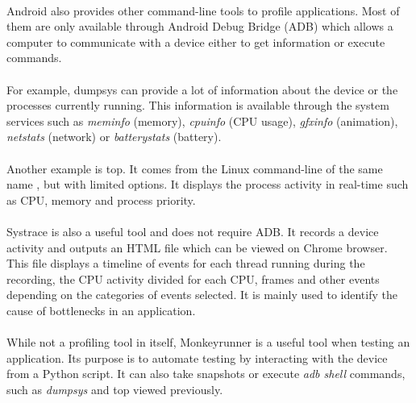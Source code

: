 \documentclass{kththesis}
\begin{document}
\paragraph{}
Android also provides other command-line tools to profile applications. Most of them are only available through Android Debug Bridge (ADB) \cite{adb} which allows a computer to communicate with a device either to get information or execute commands. 

\paragraph{}
For example, dumpsys \cite{dumpsys} can provide a lot of information about the device or the processes currently running. This information is available through the system services such as \textit{meminfo} (memory), \textit{cpuinfo} (CPU usage), \textit{gfxinfo} (animation), \textit{netstats} (network) or \textit{batterystats} (battery).

\paragraph{}
Another example is top. It comes from the Linux command-line of the same name \cite{top}, but with limited options. It displays the process activity in real-time such as CPU, memory and process priority.

\paragraph{}
Systrace \cite{systrace} is also a useful tool and does not require ADB. It records a device activity and outputs an HTML file which can be viewed on Chrome browser. This file displays a timeline of events for each thread running during the recording, the CPU activity divided for each CPU, frames and other events depending on the categories of events selected. It is mainly used to identify the cause of bottlenecks in an application.

\paragraph{}
While not a profiling tool in itself, Monkeyrunner \cite{monkeyrunner} is a useful tool when testing an application. Its purpose is to automate testing by interacting with the device from a Python script. It can also take snapshots or execute \textit{adb shell} commands, such as \textit{dumpsys} and top viewed previously. 
\end{document}
